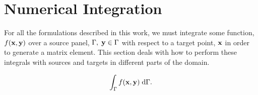 %
%




\section{Numerical Integration}\label{subsec:numerical_integration}

For all the {\bem} formulations described in this work, we must integrate some function, $f(\mathbf{x},\mathbf{y})$ over a source panel, $\Gamma,\;\mathbf{y}\in\Gamma$ with respect to a target point, $\mathbf{x}$ in order to generate a matrix element. This section deals with how to perform these integrals with sources and targets in different parts of the domain.

\begin{equation}
	\int_\Gamma f(\mathbf{x},\mathbf{y})\;\text{d}\Gamma.
\end{equation}


